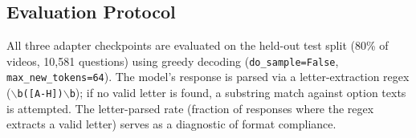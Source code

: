 \subsection{Evaluation Protocol}

All three adapter checkpoints are evaluated on the held-out test split
(80\% of videos, 10,581 questions) using greedy decoding
(\texttt{do\_sample=False}, \texttt{max\_new\_tokens=64}).
The model's response is parsed via a letter-extraction regex
(\texttt{$\backslash$b([A-H])$\backslash$b}); if no valid letter is found,
a substring match against option texts is attempted.
The letter-parsed rate (fraction of responses where the regex extracts a
valid letter) serves as a diagnostic of format compliance.
